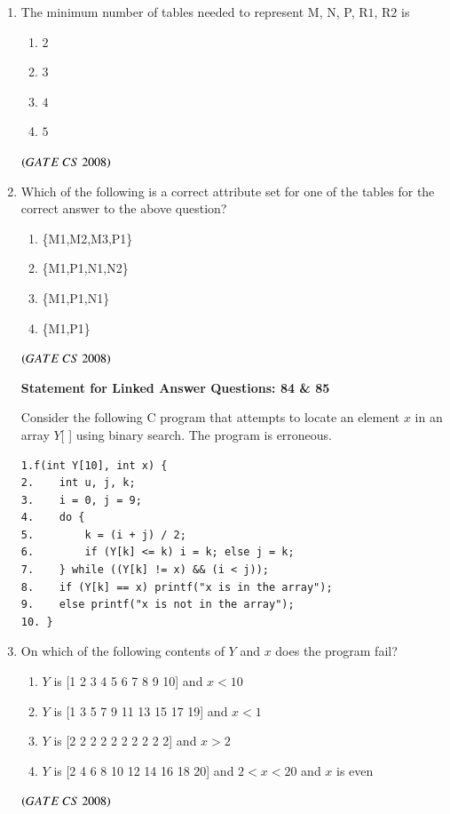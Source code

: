 \documentclass[journal, onecolumn]{IEEEtran}
\numberwithin{equation}{enumi}
\numberwithin{figure}{enumi}
\begin{document}
\begin{enumerate}
\item The minimum number of tables needed to represent M, N, P, R$1$, R$2$ is  
\vspace{-1em}%
\begin{multicols}{4}
\begin{enumerate}
   \item $2$
   \item $3$
   \item $4$
   \item $5$
\end{enumerate}
\end{multicols}
\hfill $\left(GATE\ CS\  2008\right)$

\item Which of the following is a correct attribute set for one of the tables for the correct answer to the above question?  
\vspace{-1em}%
\begin{multicols}{4}
\begin{enumerate}
\item \{M1,M2,M3,P1\}  
\item \{M1,P1,N1,N2\}  
\item \{M1,P1,N1\}  
\item \{M1,P1\}  
\end{enumerate}
\end{multicols}
\hfill $\left(GATE\ CS\  2008\right)$

\begin{center}
\textbf{Statement for Linked Answer Questions: 84 \& 85}
\end{center}
Consider the following C program that attempts to locate an element $x$ in an array $Y$[ ] using binary search. The program is erroneous.

\begin{verbatim}
1.f(int Y[10], int x) {
2.    int u, j, k;
3.    i = 0, j = 9;
4.    do {
5.        k = (i + j) / 2;
6.        if (Y[k] <= k) i = k; else j = k;
7.    } while ((Y[k] != x) && (i < j));
8.    if (Y[k] == x) printf("x is in the array");
9.    else printf("x is not in the array");
10. }
\end{verbatim}
\bigskip

\item On which of the following contents of $Y$ and $x$ does the program fail?

\begin{enumerate}
    \item $Y$ is [1 2 3 4 5 6 7 8 9 10] and $x < 10$
    \item $Y$ is [1 3 5 7 9 11 13 15 17 19] and $x < 1$
    \item $Y$ is [2 2 2 2 2 2 2 2 2 2] and $x > 2$
    \item $Y$ is [2 4 6 8 10 12 14 16 18 20] and $2 < x < 20$ and $x$ is even
\end{enumerate}
\hfill $\left(GATE\ CS\  2008\right)$
\bigskip


\end{enumerate}
\end{document}
